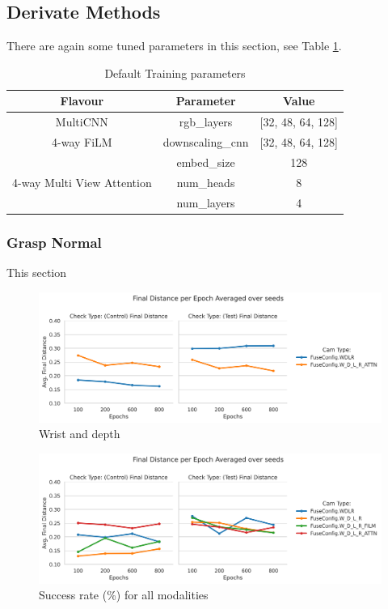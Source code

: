 \subsection{Derivate Methods}
There are again some tuned parameters in this section, see Table \ref{tab:derivative-params}.

\begin{table}[H]
\centering
  \begin{tabular}{|| c | c | c ||}
  \hline
  Flavour & Parameter & Value \\
  \hline
  \multirow{1}{*}{MultiCNN} & rgb\_layers & [32, 48, 64, 128] \\
  \hline
  \multirow{1}{*}{4-way FiLM} & downscaling\_cnn & [32, 48, 64, 128] \\
  \hline
  \multirow{3}{*}{4-way Multi View Attention} & embed\_size & 128 \\
  & num\_heads & 8 \\
  & num\_layers & 4 \\
  \hline
  \end{tabular}\caption{Default Training parameters}\label{tab:derivative-params}
\end{table}

\subsubsection{Grasp Normal}
This section
\begin{figure}[H]
  \centering
  \includegraphics[width=\linewidth]{assets/evaluation/derivatives/grasp-normal-wd.png}
  \caption{Wrist and depth}\label{fig:deriv-normal-final-wd}
\end{figure}

\begin{figure}[H]
  \centering
  \includegraphics[width=\linewidth]{assets/evaluation/derivatives/grasp-normal-allcams.png}
  \caption{Success rate (\%) for all modalities}\label{fig:deriv-normal-final-allcams}
\end{figure}

